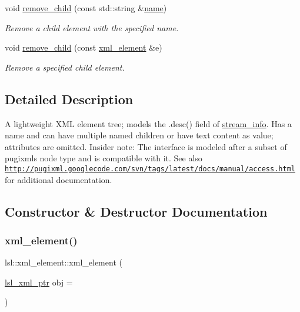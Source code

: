\begin{DoxyCompactItemize}
void \hyperlink{classlsl_1_1xml__element_ad23da57ac3a6a7f3dd849be0a8b44a47}{remove\+\_\+child} (const std\+::string \&\hyperlink{classlsl_1_1xml__element_a2e449e85b7e763b1d0db4bb19d2eb7c2}{name})
\begin{DoxyCompactList}\small\item\em Remove a child element with the specified name. \end{DoxyCompactList}\item 
void \hyperlink{classlsl_1_1xml__element_a0c07b18ef39b7f6d683b9612e2a9104e}{remove\+\_\+child} (const \hyperlink{classlsl_1_1xml__element}{xml\+\_\+element} \&e)
\begin{DoxyCompactList}\small\item\em Remove a specified child element. \end{DoxyCompactList}\end{DoxyCompactItemize}


\subsection{Detailed Description}
A lightweight X\+ML element tree; models the .desc() field of \hyperlink{classlsl_1_1stream__info}{stream\+\_\+info}. Has a name and can have multiple named children or have text content as value; attributes are omitted. Insider note\+: The interface is modeled after a subset of pugixml\textquotesingle{}s node type and is compatible with it. See also \href{http://pugixml.googlecode.com/svn/tags/latest/docs/manual/access.html}{\tt http\+://pugixml.\+googlecode.\+com/svn/tags/latest/docs/manual/access.\+html} for additional documentation. 

\subsection{Constructor \& Destructor Documentation}
\mbox{\label{classlsl_1_1xml__element_a9a2c940a06714662f3cef5e9847e8cae}} 
\subsubsection{\texorpdfstring{xml\+\_\+element()}{xml\_element()}}
{\footnotesize\ttfamily lsl\+::xml\+\_\+element\+::xml\+\_\+element (\begin{DoxyParamCaption}\item[{\hyperlink{namespacelsl_a5edc7a49a1a1be1634fe6dce3d59c59b}{lsl\+\_\+xml\+\_\+ptr}}]{obj = {} }\end{DoxyParamCaption})\hspace{0.3cm}{\ttfamily [inline]}}



